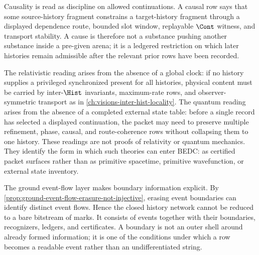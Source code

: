 \begin{principle}
\label{prin:consciousness-universe-causality-continuation-discipline}
Causality is read as discipline on allowed continuations. A causal row says that some source-history fragment constrains a target-history fragment through a displayed dependence route, bounded slot window, replayable $\Cont$ witness, and transport stability. A cause is therefore not a substance pushing another substance inside a pre-given arena; it is a ledgered restriction on which later histories remain admissible after the relevant prior rows have been recorded.
\end{principle}

\begin{remark}
\label{rem:consciousness-universe-relativity-quantum-boundary-readings}
The relativistic reading arises from the absence of a global clock: if no history supplies a privileged synchronized present for all histories, physical content must be carried by inter-$\Hist$ invariants, maximum-rate rows, and observer-symmetric transport as in \autoref{ch:visions-inter-hist-locality}. The quantum reading arises from the absence of a completed external state table: before a single record has selected a displayed continuation, the packet may need to preserve multiple refinement, phase, causal, and route-coherence rows without collapsing them to one history. These readings are not proofs of relativity or quantum mechanics. They identify the form in which such theories can enter BEDC: as certified packet surfaces rather than as primitive spacetime, primitive wavefunction, or external state inventory.
\end{remark}

\begin{remark}
\label{rem:consciousness-universe-boundaries-part-of-information}
The ground event-flow layer makes boundary information explicit. By \autoref{prop:ground-event-flow-erasure-not-injective}, erasing event boundaries can identify distinct event flows. Hence the closed history network cannot be reduced to a bare bitstream of marks. It consists of events together with their boundaries, recognizers, ledgers, and certificates. A boundary is not an outer shell around already formed information; it is one of the conditions under which a row becomes a readable event rather than an undifferentiated string.
\end{remark}

